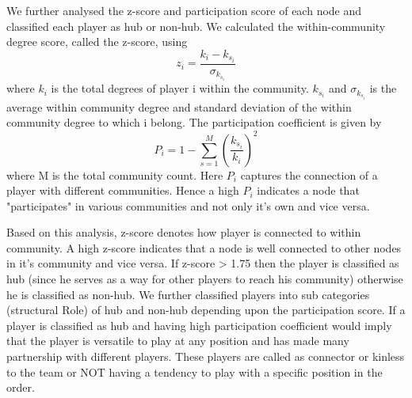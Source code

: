 \documentclass{article}
\begin{document}
We further analysed the z-score and participation score of each node and classified each player as hub or non-hub. We calculated the within-community degree score, called the z-score, using $$z_{i} = \frac{k_i - k_{s_i}}{\sigma_{k_{s_i}}}$$ where $k_i$ is the total degrees of player i within the community. $k_{s_i}$ and $\sigma_{k_{s_i}}$ is the average within community degree and standard deviation of the within community degree to which i belong. The participation coefficient is given by $$P_i = 1 - \sum_{s = 1}^{M}(\frac{k_{s_i}}{k_i})^2$$ where M is the total community count. Here $P_i$ captures the connection of a player with different communities. Hence a high $P_i$ indicates a node that "participates" in various communities and not only it's own and vice versa.

Based on this analysis, z-score denotes how player is connected to within community. A high z-score indicates that a node is well connected to other nodes in it's community and vice versa. If z-score > 1.75 then the player is classified as hub (since he serves as a way for other players to reach his community) otherwise he is classified as non-hub. We further classified players into sub categories (structural Role) of hub and non-hub depending upon the participation score. If a player is classified as hub and having high participation coefficient would imply that the player is versatile to play at any position and has made many partnership with different players. These players are called as connector or kinless to the team or NOT having a tendency to play with a specific position in the order.
\begin{table}[!h]
\end{table}
\end{document}
